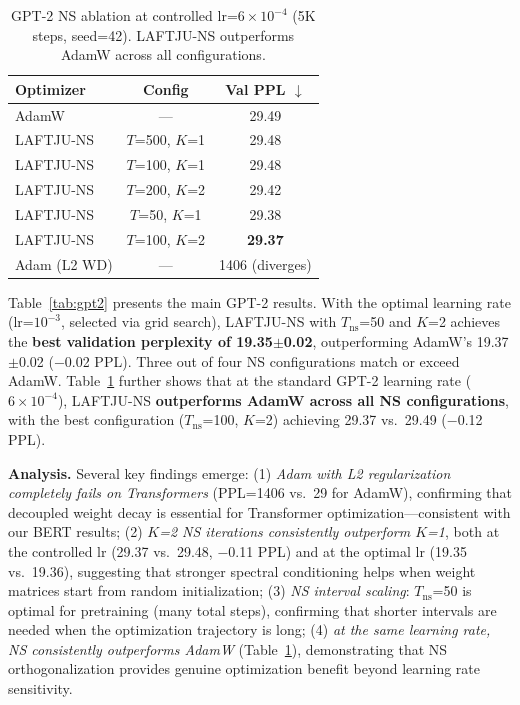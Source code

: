 \documentclass[10pt,twocolumn]{article}
\newcommand{\method}{LAFTJU}
\begin{document}
\begin{table}[t]
\centering
\caption{GPT-2 NS ablation at controlled lr=$6\times10^{-4}$ (5K steps, seed=42). \method{}-NS outperforms AdamW across all configurations.}
\label{tab:gpt2_ablation}
\small
\begin{tabular}{@{}lcc@{}}
\toprule
\textbf{Optimizer} & \textbf{Config} & \textbf{Val PPL $\downarrow$} \\
\midrule
AdamW & --- & 29.49 \\
\method{}-NS & $T$=500, $K$=1 & 29.48 \\
\method{}-NS & $T$=100, $K$=1 & 29.48 \\
\method{}-NS & $T$=200, $K$=2 & 29.42 \\
\method{}-NS & $T$=50, $K$=1 & 29.38 \\
\method{}-NS & $T$=100, $K$=2 & \textbf{29.37} \\
\midrule
Adam (L2 WD) & --- & 1406 (diverges) \\
\bottomrule
\end{tabular}
\end{table}

Table~\ref{tab:gpt2} presents the main GPT-2 results. With the optimal learning rate (lr=$10^{-3}$, selected via grid search), \method{}-NS with $T_\mathrm{ns}$=50 and $K$=2 achieves the \textbf{best validation perplexity of 19.35$\pm$0.02}, outperforming AdamW's 19.37$\pm$0.02 ($-$0.02 PPL). Three out of four NS configurations match or exceed AdamW. Table~\ref{tab:gpt2_ablation} further shows that at the standard GPT-2 learning rate ($6\times10^{-4}$), \method{}-NS \textbf{outperforms AdamW across all NS configurations}, with the best configuration ($T_\mathrm{ns}$=100, $K$=2) achieving 29.37 vs.\ 29.49 ($-$0.12 PPL).

\textbf{Analysis.} Several key findings emerge: (1) \emph{Adam with L2 regularization completely fails on Transformers} (PPL=1406 vs.\ 29 for AdamW), confirming that decoupled weight decay is essential for Transformer optimization---consistent with our BERT results; (2) \emph{$K$=2 NS iterations consistently outperform $K$=1}, both at the controlled lr (29.37 vs.\ 29.48, $-$0.11 PPL) and at the optimal lr (19.35 vs.\ 19.36), suggesting that stronger spectral conditioning helps when weight matrices start from random initialization; (3) \emph{NS interval scaling}: $T_\mathrm{ns}$=50 is optimal for pretraining (many total steps), confirming that shorter intervals are needed when the optimization trajectory is long; (4) \emph{at the same learning rate, NS consistently outperforms AdamW} (Table~\ref{tab:gpt2_ablation}), demonstrating that NS orthogonalization provides genuine optimization benefit beyond learning rate sensitivity.
\end{document}
